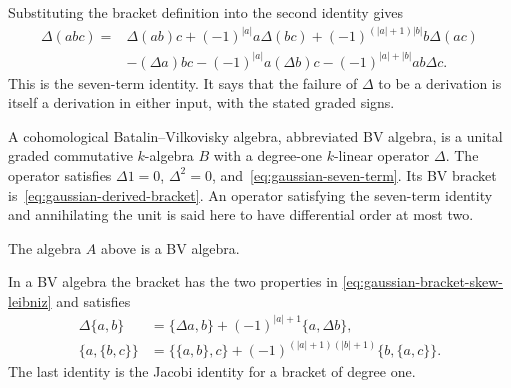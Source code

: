 Substituting the bracket definition into the second identity gives
\begin{equation}\label{eq:gaussian-seven-term}
 \begin{split}
 \Delta(abc)={}&\Delta(ab)c+(-1)^{|a|}a\Delta(bc)
       +(-1)^{(|a|+1)|b|}b\Delta(ac)\\
 &-(\Delta a)bc-(-1)^{|a|}a(\Delta b)c
       -(-1)^{|a|+|b|}ab\Delta c.
 \end{split}
\end{equation}
This is the seven-term identity.
It says that the failure of $\Delta$ to be a derivation is itself a
derivation in either input, with the stated graded signs.

\begin{definition}\label{def:gaussian-bv}
A cohomological Batalin--Vilkovisky algebra, abbreviated BV algebra,
is a unital graded commutative $k$-algebra $B$ with a degree-one
$k$-linear operator $\Delta$.
The operator satisfies
$\Delta1=0$, $\Delta^2=0$, and~\eqref{eq:gaussian-seven-term}.
Its BV bracket is~\eqref{eq:gaussian-derived-bracket}.
An operator satisfying the seven-term identity and annihilating the unit
is said here to have differential order at most two.
\end{definition}

The algebra $A$ above is a BV algebra.

\begin{proposition}\label{prop:gaussian-bv-identities}
In a BV algebra the bracket has the two properties in
\eqref{eq:gaussian-bracket-skew-leibniz} and satisfies
\begin{align}
 \Delta\{a,b\}
 &=\{\Delta a,b\}+(-1)^{|a|+1}\{a,\Delta b\},
 \label{eq:gaussian-delta-bracket}\\
 \{a,\{b,c\}\}
 &=\{\{a,b\},c\}
  +(-1)^{(|a|+1)(|b|+1)}\{b,\{a,c\}\}.
 \label{eq:gaussian-jacobi}
\end{align}
The last identity is the Jacobi identity for a bracket of degree one.
\end{proposition}

